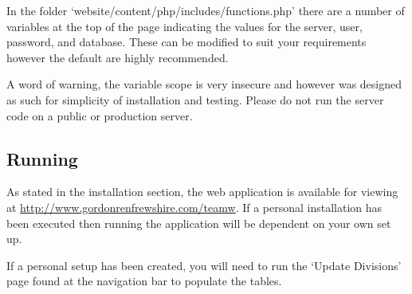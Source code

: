 In the folder `website/content/php/includes/functions.php' there are a number
of variables at the top of the page indicating the values for the server, user,
password, and database. These can be modified to suit your requirements however
the default are highly recommended.

A word of warning, the variable scope is very insecure and however was designed
as such for simplicity of installation and testing. Please do not run the server
code on a public or production server.

\subsection{Running}

As stated in the installation section, the web application is available for
viewing at \url{http://www.gordonrenfrewshire.com/teamw}. If a personal
installation has been executed then running the application will be dependent
on your own set up.

If a personal setup has been created, you will need to run the `Update
Divisions' page found at the navigation bar to populate the tables.
